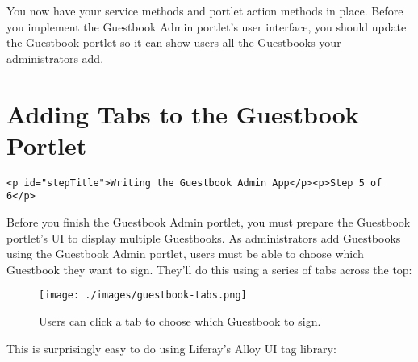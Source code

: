You now have your service methods and portlet action methods in place.
Before you implement the Guestbook Admin portlet's user interface, you
should update the Guestbook portlet so it can show users all the
Guestbooks your administrators add.

\chapter{Adding Tabs to the Guestbook
Portlet}\label{adding-tabs-to-the-guestbook-portlet}

\begin{verbatim}
<p id="stepTitle">Writing the Guestbook Admin App</p><p>Step 5 of 6</p>
\end{verbatim}

Before you finish the Guestbook Admin portlet, you must prepare the
Guestbook portlet's UI to display multiple Guestbooks. As administrators
add Guestbooks using the Guestbook Admin portlet, users must be able to
choose which Guestbook they want to sign. They'll do this using a series
of tabs across the top:

\begin{figure}
\centering
\texttt{[image: ./images/guestbook-tabs.png]}
\caption{Users can click a tab to choose which Guestbook to sign.}
\end{figure}

This is surprisingly easy to do using Liferay's Alloy UI tag library:

